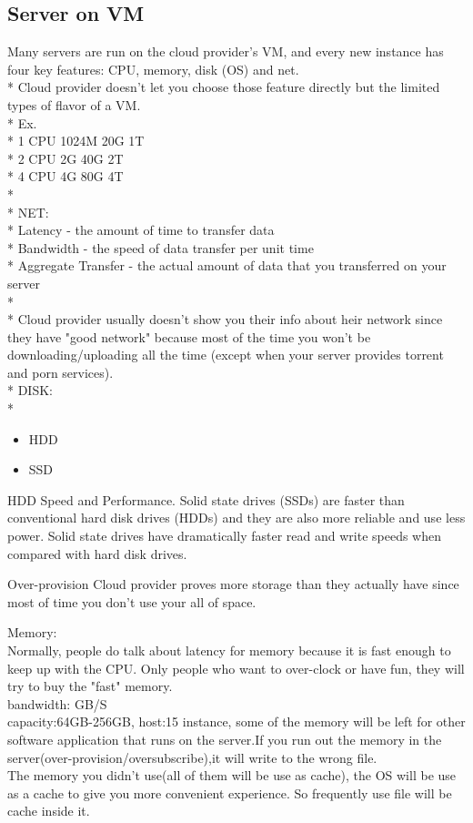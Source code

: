\documentclass[fancy,11pt,titlestyle=display]{style/elegantbook}
\begin{document}
\subsection{Server on VM}
Many servers are run on the cloud provider's VM, and every new instance has four key features: CPU, memory, disk (OS) and net.\\*
Cloud provider doesn't let you choose those feature directly but the limited types of flavor of a VM.\\*
Ex. \\*
1  CPU   1024M   20G 1T \\*
2 CPU   2G      40G 2T\\*
4 CPU   4G      80G 4T\\*
\\*
NET:\\*
    Latency - the amount of time to transfer data\\*
    Bandwidth - the speed of data transfer per unit time\\*
    Aggregate Transfer - the actual amount of data that you transferred on your server \\*
\\*
Cloud provider usually doesn't show you their info about heir network since they have "good network" because most of the time you won't be downloading/uploading all the time (except when your server provides torrent and porn services). \\*
DISK:\\*
    \begin{itemize}
\item HDD
 
\item SSD

\end{itemize}

HDD Speed and Performance. Solid state drives (SSDs) are faster than conventional hard disk drives (HDDs) and they are also more reliable and use less power. Solid state drives have dramatically faster read and write speeds when compared with hard disk drives.


\begin{definition}{Over-provision}{}
Cloud provider proves more storage than they actually have since most of time you don't use your all of space.
\end{definition}




Memory:\\
Normally, people do talk about latency for memory because it is fast enough to keep up with the CPU.
Only people who want to over-clock or have fun, they will try to buy the "fast" memory.\\
bandwidth: GB/S\\
capacity:64GB-256GB, host:15 instance, some of the memory will be left for
other software application that runs on the server.If you run out the memory in the server(over-provision/oversubscribe),it will write to the wrong file.\\
The memory you didn't use(all of them will be use as cache), the OS will be use as a cache to give you more convenient experience. So frequently use file will be cache inside it.\\ 
\end{document}
